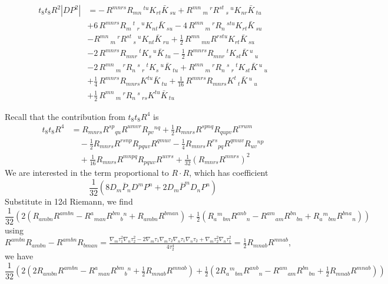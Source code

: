 \begin{equation}
\begin{aligned}
t_8 t_8 R^2 |DP^2|
&=-\,R^{m n r s} R_{m n}\,^{t u} K_{r t} \bar{K}\,_{s u}
+R^{m n}\,_{m}\,^{r} R^{s t}\,_{s}\,^{u} K_{n r} \bar{K}\,_{t u}\\
&+6\,R^{m n r s} R_{m}\,^{t}\,_{r}\,^{u} K_{n t} \bar{K}\,_{s u}
-4\,R^{m n}\,_{m}\,^{r} R_{n}\,^{s t u} K_{r t} \bar{K}\,_{s u}\\
&-R^{m n}\,_{m}\,^{r} R^{s t}\,_{s}\,^{u} K_{n t} \bar{K}\,_{r u}
+\frac{1}{2}\,R^{m n}\,_{m n} R^{r s t u} K_{r t} \bar{K}\,_{s u}\\
&-2\,R^{m n r s} R_{m n r}\,^{t} K_{s}\,^{u} \bar{K}\,_{t u}
-\frac{1}{2}\,R^{m n r s} R_{m n r}\,^{t} K_{s t} \bar{K}\,^{u}\,_{u}\\
&-2\,R^{m n}\,_{m}\,^{r} R_{n}\,^{s}\,_{r}\,^{t} K_{s}\,^{u} \bar{K}\,_{t u}
+R^{m n}\,_{m}\,^{r} R_{n}\,^{s}\,_{r}\,^{t} K_{s t} \bar{K}\,^{u}\,_{u}\\
&+\frac{1}{4}\,R^{m n r s} R_{m n r s} K^{t u} \bar{K}\,_{t u}
+\frac{1}{16}\,R^{m n r s} R_{m n r s} K^{t}\,_{t} \bar{K}\,^{u}\,_{u}\\
&+\frac{1}{2}\,R^{m n}\,_{m}\,^{r} R_{n}\,^{s}\,_{r s} K^{t u} \bar{K}\,_{t u}
\end{aligned}
\end{equation}


Recall that the contribution from $t_8 t_8 R^4$ is
\begin{equation}
\begin{aligned}
t_8 t_8 R^4 
&= R_{mnrs} R^{sp}{}_{qu} R^{umvr} R_{pv}{}^{nq}
+ \frac{1}{2} R_{mnrs} R^{spnq} R_{qupv} R^{vrum} \\
&\quad - \frac{1}{2} R_{mnrs} R^{rsnp} R_{pquv} R^{qmuv}
- \frac{1}{4} R_{mnrs} R^{rs}{}_{pq} R^{qmuv} R_{uv}{}^{np}\\
&\quad + \frac{1}{16} R_{mnrs} R^{mnpq} R_{pquv} R^{uvrs}
+ \frac{1}{32} (R_{mnrs} R^{mnrs})^2
\end{aligned}
\end{equation}
We are interested in the term proportional to $R\cdot R$, which has coefficient
\begin{equation}
\frac{1}{32}( 8 D_m \bar{P}_n D^m P^n + 2 D_m \bar{P}^m D_n P^n)
\end{equation}
Substitute in 12d Riemann, we find
\begin{equation}
\frac{1}{32}( 2 (R_{ambn} R^{ambn} - R^a{}_{man} R^{bm}{}_{b}{}^{n} + R_{ambn} R^{bman}) + \tfrac{1}{2} (R_a{}^{m}{}_{bm} R^{anb}{}_{n} - R^{am}{}_{am} R^{bn}{}_{bn} + R_{a}{}^m{}_{bm} R^{bna}{}_{n}))
\end{equation}
using $R^{ambn}R_{ambn} - R^{ambn}R_{bman} = \frac{\nabla_{m} \tau_{1}^{2} \nabla_{n} \tau_{2}^{2} - 2 \nabla_{m} \tau_{1} \nabla_{m} \tau_{2} \nabla_{n} \tau_{1} \nabla_{n} \tau_{2} + \nabla_{m} \tau_{2}^{2} \nabla_{n} \tau_{1}^{2}}{4 \tau_{2}^{4}} = \frac{1}{2}R_{mnab}R^{mnab}$, we have
\begin{equation}
\frac{1}{32}( 2 (2R_{ambn} R^{ambn} - R^a{}_{man} R^{bm}{}_{b}{}^{n} + \tfrac12 R_{mnab} R^{mnab}) + \tfrac{1}{2} (2R_a{}^{m}{}_{bm} R^{anb}{}_{n} - R^{am}{}_{am} R^{bn}{}_{bn} + \tfrac12 R_{mnab} R^{mnab}))
\end{equation}